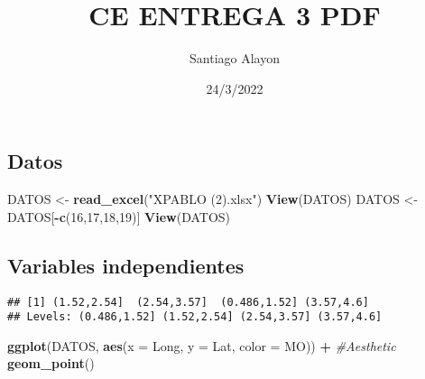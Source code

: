 \documentclass[
]{article}
\title{CE ENTREGA 3 PDF}
\author{Santiago Alayon}
\date{24/3/2022}
\newenvironment{Shaded}{\begin{snugshade}}{\end{snugshade}}
\newcommand{\CommentTok}[1]{\textcolor[rgb]{0.56,0.35,0.01}{\textit{#1}}}
\newcommand{\DataTypeTok}[1]{\textcolor[rgb]{0.13,0.29,0.53}{#1}}
\newcommand{\DecValTok}[1]{\textcolor[rgb]{0.00,0.00,0.81}{#1}}
\newcommand{\KeywordTok}[1]{\textcolor[rgb]{0.13,0.29,0.53}{\textbf{#1}}}
\newcommand{\NormalTok}[1]{#1}
\newcommand{\OperatorTok}[1]{\textcolor[rgb]{0.81,0.36,0.00}{\textbf{#1}}}
\newcommand{\StringTok}[1]{\textcolor[rgb]{0.31,0.60,0.02}{#1}}
\begin{document}
\maketitle

\hypertarget{datos}{%
\subsection{Datos}\label{datos}}

\begin{Shaded}
\begin{Highlighting}[]
\NormalTok{DATOS <-}\StringTok{ }\KeywordTok{read_excel}\NormalTok{(}\StringTok{"XPABLO (2).xlsx"}\NormalTok{)}
\KeywordTok{View}\NormalTok{(DATOS)}
\NormalTok{DATOS <-}\StringTok{ }\NormalTok{DATOS[}\OperatorTok{-}\KeywordTok{c}\NormalTok{(}\DecValTok{16}\NormalTok{,}\DecValTok{17}\NormalTok{,}\DecValTok{18}\NormalTok{,}\DecValTok{19}\NormalTok{)]}
\KeywordTok{View}\NormalTok{(DATOS)}
\end{Highlighting}
\end{Shaded}

\hypertarget{variables-independientes}{%
\subsection{Variables independientes}\label{variables-independientes}}

\begin{Shaded}
\end{Shaded}

\begin{verbatim}
## [1] (1.52,2.54]  (2.54,3.57]  (0.486,1.52] (3.57,4.6]  
## Levels: (0.486,1.52] (1.52,2.54] (2.54,3.57] (3.57,4.6]
\end{verbatim}

\begin{Shaded}
\begin{Highlighting}[]
\KeywordTok{ggplot}\NormalTok{(DATOS, }\KeywordTok{aes}\NormalTok{(}\DataTypeTok{x =}\NormalTok{ Long, }\DataTypeTok{y =}\NormalTok{ Lat, }\DataTypeTok{color =}\NormalTok{ MO)) }\OperatorTok{+}\StringTok{ }\CommentTok{#Aesthetic}
\StringTok{  }\KeywordTok{geom_point}\NormalTok{()}
\end{Highlighting}
\end{Shaded}
\end{document}
